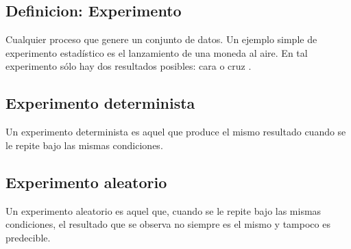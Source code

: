 \documentclass{article}
\begin{document}
\subsection{Definicion: Experimento}

Cualquier proceso que genere un conjunto de datos. Un ejemplo simple de
experimento estadístico es el lanzamiento de una moneda al aire. En tal
experimento sólo hay dos resultados posibles: cara o cruz
\cite{walpole2012probabilidad}.

\subsection{Experimento determinista}
Un experimento determinista es aquel que produce el mismo resultado cuando se le
repite bajo las mismas condiciones.

\subsection{Experimento aleatorio}
Un experimento aleatorio es aquel que, cuando se le repite bajo las mismas
condiciones, el resultado que se observa no siempre es el mismo y tampoco es
predecible.

\pagebreak
 

\end{document}
